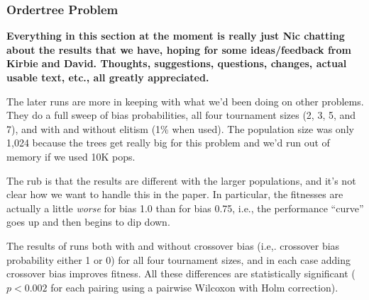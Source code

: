 \documentclass{sig-alternate}
\begin{document}
%
%
%
%

%
%
%
%

\subsubsection{Ordertree Problem}

\textbf{Everything in this section at the moment is really just Nic chatting about the results that we have, hoping for 
some ideas/feedback from Kirbie and David. Thoughts, suggestions, questions, changes, actual usable text, etc., all 
greatly appreciated.}

The later runs are more in keeping with what we'd been doing on other problems. They do a full sweep of bias 
probabilities, all four tournament sizes (2, 3, 5, and 7), and with and without elitism (1\% when used). The population 
size was only 1,024 because the trees get really big for this problem and we'd run out of memory if we used 10K 
pops.

The rub is that the results are different with the larger populations, and it's not clear how we want to handle this in the 
paper. In particular, the fitnesses are actually a little \emph{worse} for bias 1.0 than for bias 0.75, i.e., the performance 
``curve'' goes up and then begins to dip down.

The results of runs both with and without crossover bias (i.e,. 
crossover bias probability either 1 or 0) for all four tournament sizes, and in each case adding crossover bias 
improves fitness. All these differences are statistically significant ($p < 0.002$ for each pairing using a pairwise 
Wilcoxon with Holm correction).
\end{document}
